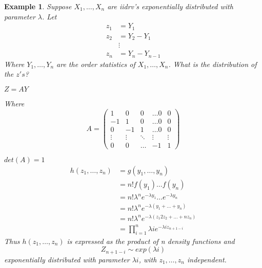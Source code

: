 \documentclass{notes}
\theoremstyle{plain}
\newtheorem*{example}{Example}
\begin{document}
\begin{example}
Suppose  $X_1,\dots,X_n$ are iidrv's exponentially distributed with
parameter $\lambda$. Let
\begin{align*}
z_1 &=Y_1\\
z_2 & = Y_2 -Y_1\\
&\vdots\\
z_n &=Y_n-Y_{n-1}
\end{align*}
Where $Y_1,\dots,Y_n$ are the order statistics of
$X_1,\dots,X_n$. What is  the distribution of the $z's$?

$Z=AY$

Where
\begin{equation} 
A=
\begin{pmatrix} 
1 & 0 & 0&\dots  0&0\\
-1& 1 & 0& \dots 0 &0\\
0& -1 & 1& \dots 0 &0\\
\vdots&\vdots&\ddots&\vdots &\vdots\\
0 & 0 & \dots&-1&1
\end{pmatrix}
\end{equation}

$det(A) = 1$
\begin{align*}
h(z_1,\dots,z_n)&= g(y_1,\dots,y_n)\\
&=n!f(y_1)\dots f(y_n)\\
&=n! \lambda^n e^{-\lambda y_1}\dots  e^{-\lambda y_n}\\
&=n! \lambda^n e^{-\lambda(y_1 +\dots +y_n)}\\
&=n! \lambda^n e^{-\lambda(z_1 2z_2 +\dots + nz_n)}\\
&= \prod_{i=1}^{n}\lambda ie^{-\lambda iz_{n+1-i}}
\end{align*}
Thus $h(z_1,\dots,z_n)$ is expressed as the product of n density
functions and
\[
Z_{n+1-i} \sim exp(\lambda i)
\]
exponentially distributed with parameter $\lambda i$, with
$z_1,\dots,z_n$ independent.
\end{example}
\end{document}
